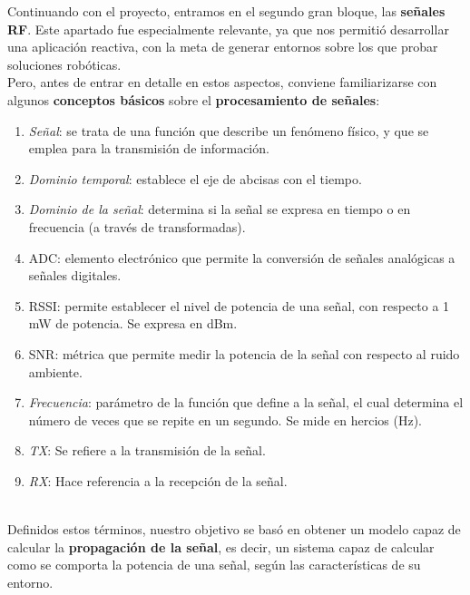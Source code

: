 Continuando con el proyecto, entramos en el segundo gran bloque, las \textbf{señales \ac{RF}}. Este apartado fue especialmente relevante, ya que nos permitió desarrollar una aplicación reactiva, con la meta de generar entornos sobre los que probar soluciones robóticas.\\

Pero, antes de entrar en detalle en estos aspectos, conviene familiarizarse con algunos \textbf{conceptos básicos} sobre el \textbf{procesamiento de señales}:

\begin{enumerate}
	\item \emph{Señal}: se trata de una función que describe un fenómeno físico, y que se emplea para la transmisión de información.
	
    \item \emph{Dominio temporal}: establece el eje de abcisas con el tiempo. 
    
    \item \emph{Dominio de la señal}: determina si la señal se expresa en tiempo o en frecuencia (a través de transformadas).
    
    \item \ac{ADC}: elemento electrónico que permite la conversión de señales analógicas a señales digitales.
    
    \item \ac{RSSI}: permite establecer el nivel de potencia de una señal, con respecto a 1 mW de potencia. Se expresa en dBm.
    
    \item \ac{SNR}: métrica que permite medir la potencia de la señal con respecto al ruido ambiente.

    \item \emph{Frecuencia}: parámetro de la función que define a la señal, el cual determina el número de veces que se repite en un segundo. Se mide en hercios (Hz).
    
    \item \emph{TX}: Se refiere a la transmisión de la señal.
    
    \item \emph{RX}: Hace referencia a la recepción de la señal.
\end{enumerate} \cite{basics-signals}\\

Definidos estos términos, nuestro objetivo se basó en obtener un modelo capaz de calcular la \textbf{propagación de la señal}, es decir, un sistema capaz de calcular como se comporta la potencia de una señal, según las características de su entorno.\\


